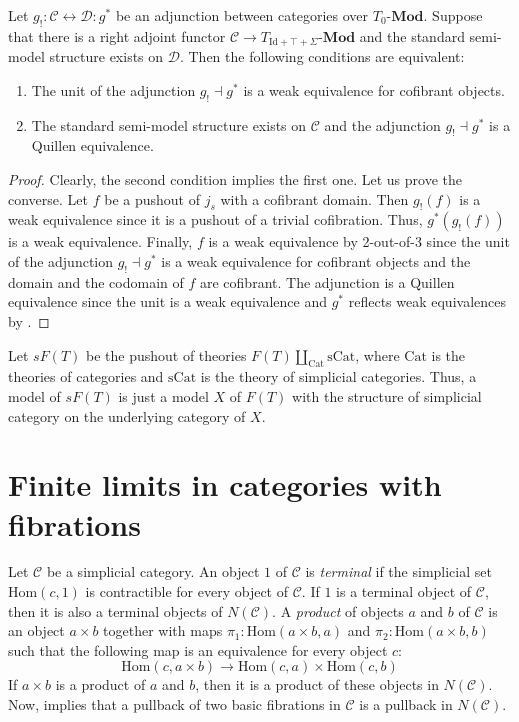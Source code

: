 \documentclass[reqno]{amsart}
\theoremstyle{definition}
\theoremstyle{remark}
\newcommand{\fs}[1]{\mathrm{#1}}
\newcommand{\Hom}{\fs{Hom}}
\newcommand{\cat}[1]{\mathcal{#1}}
\newcommand{\C}{\cat{C}}
\newcommand{\bcat}[1]{\mathbf{#1}}
\newcommand{\Mod}[1]{#1\text{-}\bcat{Mod}}
\numberwithin{figure}{section}
\begin{document}
\begin{prop}
Let $g_! : \mathcal{C} \leftrightarrow \mathcal{D} : g^*$ be an adjunction between categories over $\Mod{T_0}$.
Suppose that there is a right adjoint functor $\mathcal{C} \to \Mod{T_{\fs{Id} + \top + \Sigma}}$ and the standard semi-model structure exists on $\mathcal{D}$.
Then the following conditions are equivalent:
\begin{enumerate}
\item The unit of the adjunction $g_! \dashv g^*$ is a weak equivalence for cofibrant objects.
\item The standard semi-model structure exists on $\mathcal{C}$ and the adjunction $g_! \dashv g^*$ is a Quillen equivalence.
\end{enumerate}
\end{prop}
\begin{proof}
Clearly, the second condition implies the first one.
Let us prove the converse.
Let $f$ be a pushout of $j_s$ with a cofibrant domain.
Then $g_!(f)$ is a weak equivalence since it is a pushout of a trivial cofibration.
Thus, $g^*(g_!(f))$ is a weak equivalence.
Finally, $f$ is a weak equivalence by 2-out-of-3 since the unit of the adjunction $g_! \dashv g^*$ is a weak equivalence for cofibrant objects and the domain and the codomain of $f$ are cofibrant.
The adjunction is a Quillen equivalence since the unit is a weak equivalence and $g^*$ reflects weak equivalences by .
\end{proof}


Let $sF(T)$ be the pushout of theories $F(T) \amalg_{\fs{Cat}} \fs{\fs{sCat}}$, where $\fs{Cat}$ is the theories of categories and $\fs{sCat}$ is the theory of simplicial categories.
Thus, a model of $sF(T)$ is just a model $X$ of $F(T)$ with the structure of simplicial category on the underlying category of $X$.


\section{Finite limits in categories with fibrations}

Let $\C$ be a simplicial category.
An object $1$ of $\C$ is \emph{terminal} if the simplicial set $\Hom(c,1)$ is contractible for every object of $\C$.
If $1$ is a terminal object of $\C$, then it is also a terminal objects of $N(\C)$.
A \emph{product} of objects $a$ and $b$ of $\C$ is an object $a \times b$ together with maps $\pi_1 : \Hom(a \times b, a)$ and $\pi_2 : \Hom(a \times b, b)$ such that the following map is an equivalence for every object $c$:
\[ \Hom(c, a \times b) \to \Hom(c,a) \times \Hom(c,b) \]
If $a \times b$ is a product of $a$ and $b$, then it is a product of these objects in $N(\C)$.
Now,  implies that a pullback of two basic fibrations in $\C$ is a pullback in $N(\C)$.



\end{document}

